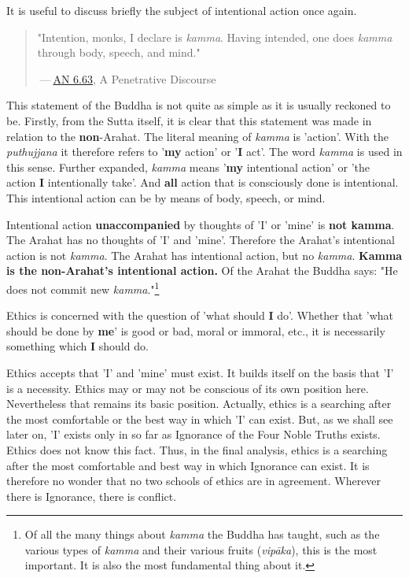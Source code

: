 It is useful to discuss briefly the subject of intentional action once
again.


\begin{quotation}
"Intention, monks, I declare is \emph{kamma}. Having intended, one does
\emph{kamma} through body, speech, and mind."


 — \href{https://suttacentral.net/an6.63/en/thanissaro}{AN 6.63}, A Penetrative Discourse


\end{quotation}

This statement of the Buddha is not quite as simple as it is usually
reckoned to be. Firstly, from the Sutta itself, it is
clear that this statement was made in relation to the \textbf{non}-Arahat.
The literal meaning of \emph{kamma} is 'action'. With the \emph{puthujjana} it
therefore refers to '\textbf{my} action' or '\textbf{I} act'. The word \emph{kamma} is
used in this sense. Further expanded, \emph{kamma} means '\textbf{my} intentional
action' or 'the action \textbf{I} intentionally take'. And \textbf{all} action that is
consciously done is intentional. This intentional action can be by means
of body, speech, or mind.


Intentional action \textbf{unaccompanied} by thoughts of 'I' or 'mine' is \textbf{not
kamma}. The Arahat has no thoughts of 'I' and 'mine'. Therefore the
Arahat’s intentional action is not \emph{kamma}. The Arahat has intentional
action, but no \emph{kamma}. \textbf{Kamma is the non-Arahat’s intentional
action.} Of the Arahat the Buddha says: "He does not commit new
\emph{kamma}."\footnote{Of all the many things about \emph{kamma} the Buddha has taught, such as the various types of \emph{kamma} and their various fruits (\emph{vipāka}), this is the most important. It is also the most fundamental thing about it.}


Ethics is concerned with the question of 'what should \textbf{I} do'. Whether
that 'what should be done by \textbf{me}' is good or bad, moral or immoral,
etc., it is necessarily something which \textbf{I} should do.


Ethics accepts that 'I' and 'mine' must exist. It builds itself on the
basis that 'I' is a necessity. Ethics may or may not be conscious of its
own position here. Nevertheless that remains its basic position.
Actually, ethics is a searching after the most comfortable or the best
way in which 'I' can exist. But, as we shall see later on, 'I' exists
only in so far as Ignorance of the Four Noble Truths exists. Ethics does
not know this fact. Thus, in the final analysis, ethics is a searching
after the most comfortable and best way in which Ignorance can exist. It
is therefore no wonder that no two schools of ethics are in agreement.
Wherever there is Ignorance, there is conflict.


